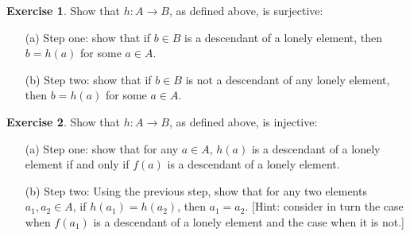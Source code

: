 \documentclass[11pt]{article}
\theoremstyle{definition}
\newtheorem{exer}{Exercise}
\begin{document}
\begin{exer}
Show that $h: A \rightarrow B$, as defined above, is surjective:
\begin{enumerate}
\item[(a)] Step one: show that if $b \in B$ is a descendant of a lonely element, then $b = h(a)$ for some $a \in A$.
\item[(b)] Step two: show that if $b \in B$ is not a descendant of any lonely element, then $b = h(a)$ for some $a \in A$.
\end{enumerate}
\end{exer}

\begin{exer}
Show that $h: A \rightarrow B$, as defined above, is injective:
\begin{enumerate}
\item[(a)] Step one: show that for any $a \in A$, $h(a)$ is a descendant of a lonely element if and only if $f(a)$ is a descendant of a lonely element.
\item[(b)] Step two: Using the previous step, show that for any two elements $a_1, a_2 \in A$, if $h(a_1) = h(a_2)$, then $a_1 = a_2$. [Hint: consider in turn the case when $f(a_1)$ is a descendant of a lonely element and the case when it is not.]
\end{enumerate}
\end{exer}
\end{document}
